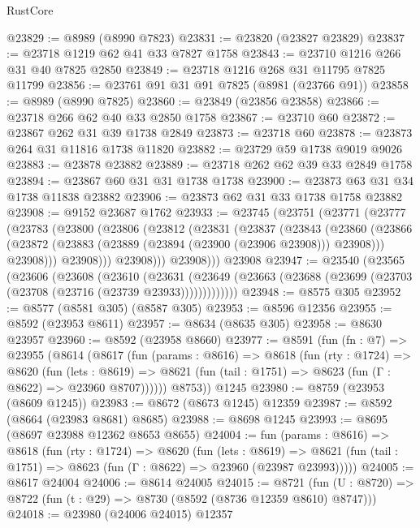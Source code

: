 \begin{lexlean}{RustCore}
\begin{coremodule}
@23829 := @8989 (@8990 @7823)
@23831 := @23820 (@23827 @23829)
@23837 := @23718 @1219 @62 @41 @33 @7827 @1758
@23843 := @23710 @1216 @266 @31 @40 @7825 @2850
@23849 := @23718 @1216 @268 @31 @11795 @7825 @11799
@23856 := @23761 @91 @31 @91 @7825 (@8981 (@23766 @91))
@23858 := @8989 (@8990 @7825)
@23860 := @23849 (@23856 @23858)
@23866 := @23718 @266 @62 @40 @33 @2850 @1758
@23867 := @23710 @60
@23872 := @23867 @262 @31 @39 @1738 @2849
@23873 := @23718 @60
@23878 := @23873 @264 @31 @11816 @1738 @11820
@23882 := @23729 @59 @1738 @9019 @9026
@23883 := @23878 @23882
@23889 := @23718 @262 @62 @39 @33 @2849 @1758
@23894 := @23867 @60 @31 @31 @1738 @1738
@23900 := @23873 @63 @31 @34 @1738 @11838 @23882
@23906 := @23873 @62 @31 @33 @1738 @1758 @23882
@23908 := @9152 @23687 @1762
@23933 := @23745
    (@23751
      (@23771
        (@23777
          (@23783
            (@23800
              (@23806
                (@23812
                  (@23831
                    (@23837
                      (@23843
                        (@23860
                          (@23866
                            (@23872 (@23883 (@23889 (@23894 (@23900 (@23906 @23908))) @23908)))
                            @23908)))
                      @23908)))
                @23908)))
          @23908)))
    @23908
@23947 := @23540
    (@23565
      (@23606
        (@23608
          (@23610
            (@23631
              (@23649 (@23663 (@23688 (@23699 (@23703 (@23708 (@23716 (@23739 @23933)))))))))))))
@23948 := @8575 @305
@23952 := @8577 (@8581 @305) (@8587 @305)
@23953 := @8596 @12356
@23955 := @8592 (@23953 @8611)
@23957 := @8634 (@8635 @305)
@23958 := @8630 @23957
@23960 := @8592 (@23958 @8660)
@23977 := @8591
    (fun (fn : @7) =>
    @23955
      (@8614
        (@8617
          (fun (params : @8616) =>
          @8618
            (fun (rty : @1724) =>
            @8620
              (fun (lets : @8619) =>
              @8621 (fun (tail : @1751) => @8623 (fun (Γ : @8622) => @23960 @8707))))))
        @8753))
    @1245
@23980 := @8759 (@23953 (@8609 @1245))
@23983 := @8672 (@8673 @1245) @12359
@23987 := @8592 (@8664 (@23983 @8681) @8685)
@23988 := @8698 @1245
@23993 := @8695 (@8697 @23988 @12362 @8653 @8655)
@24004 := fun (params : @8616) =>
  @8618
    (fun (rty : @1724) =>
    @8620
      (fun (lets : @8619) =>
      @8621 (fun (tail : @1751) => @8623 (fun (Γ : @8622) => @23960 (@23987 @23993)))))
@24005 := @8617 @24004
@24006 := @8614 @24005
@24015 := @8721
    (fun (U : @8720) => @8722 (fun (t : @29) => @8730 (@8592 (@8736 @12359 @8610) @8747)))
@24018 := @23980 (@24006 @24015) @12357

\end{coremodule}
\end{lexlean}

